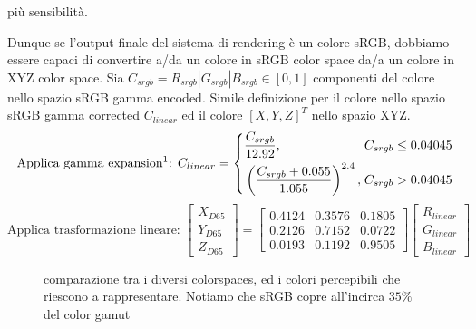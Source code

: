 pi\`u sensibilit\`a.\par
Dunque se l'output finale del sistema di rendering \`e un colore sRGB, dobbiamo essere capaci di convertire a/da un colore in sRGB color space da/a un
colore in XYZ color space. Sia $C_{srgb} = R_{srgb}|G_{srgb}|B_{srgb} \in [0,1]$ componenti del colore nello spazio sRGB gamma encoded. Simile
definizione per il colore nello spazio sRGB gamma corrected $C_{linear}$ ed il colore $[X, Y, Z]^T$ nello spazio XYZ.
\begin{equation}\label{chapter2:colorimetry:sRGB2XYZ}
	\text{Applica gamma expansion\footnotemark{}: }C_{linear} = \left\{\begin{alignedat}{2}
		&\frac{C_{srgb}}{12.92}, &C_{srgb}\leq 0.04045\\
		&\left(\frac{C_{srgb}+0.055}{1.055}\right)^{2.4},\;&C_{srgb}> 0.04045
	\end{alignedat}\right.
\end{equation}
\begin{equation}
	\text{Applica trasformazione lineare: }\begin{bmatrix}
		X_{D65}\\ Y_{D65}\\ Z_{D65}
	\end{bmatrix}=
	\begin{bmatrix}
		0.4124 & 0.3576 & 0.1805 \\
		0.2126 & 0.7152 & 0.0722 \\
		0.0193 & 0.1192 & 0.9505 
	\end{bmatrix}
	\begin{bmatrix}
		R_{linear} \\ G_{linear} \\ B_{linear}
	\end{bmatrix}
\end{equation}
\begin{figure}[tb]
	
	\caption{comparazione tra i diversi colorspaces, ed i colori percepibili che riescono a rappresentare. Notiamo che sRGB copre all'incirca $35\%$
	del color gamut}
	\label{chapter2:colorimetry:gamut}
\end{figure}

